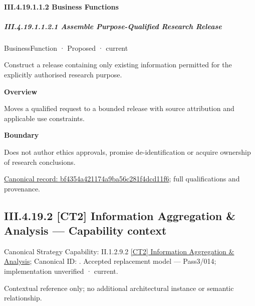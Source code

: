 \paragraph*{III.4.19.1.1.2 Business Functions}
\label{navigation:III.4.19.1.1.2}

\subparagraph*{III.4.19.1.1.2.1 Assemble Purpose-Qualified Research Release}
\label{navigation:III.4.19.1.1.2.1}

\label{element:bf4354a421174a9ba56c281f4dcd11f6}
{\small BusinessFunction · Proposed · current}\par

Construct a release containing only existing information permitted for the explicitly authorised research purpose.



\textbf{Overview}



Moves a qualified request to a bounded release with source attribution and applicable use constraints.



\textbf{Boundary}



Does not author ethics approvals, promise de-identification or acquire ownership of research conclusions.


{\footnotesize \href{../../../../../../../continuum/business/business-function/bf4354a421174a9ba56c281f4dcd11f6.md}{Canonical record: bf4354a421174a9ba56c281f4dcd11f6}; full qualifications and provenance.}\par
\subsection*{III.4.19.2 [CT2] Information Aggregation \& Analysis — Capability context}
\label{navigation:III.4.19.2}

{\small Canonical Strategy Capability: II.1.2.9.2 \hyperref[element:1387ed8b07444d06a10eb60a47d5af8a]{[CT2] Information Aggregation \& Analysis}; Canonical ID: \texttt{}. Accepted replacement model — Pass3/014; implementation unverified · current.}\par
Contextual reference only; no additional architectural instance or semantic relationship.\par
